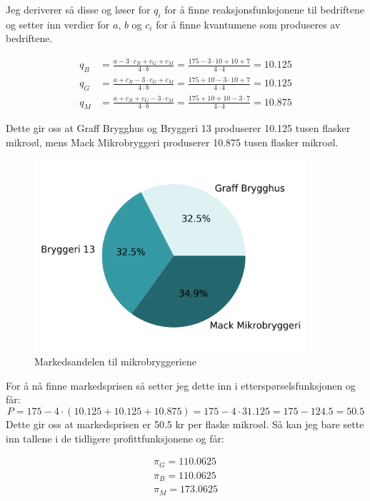 \documentclass[
  12pt,
  a4paper,
  DIV=11,
  numbers=noendperiod]{scrartcl}
\begin{document}
Jeg deriverer så disse og løser for \(q_i\) for å finne
reaksjonsfunksjonene til bedriftene og setter inn verdier for \(a\),
\(b\) og \(c_i\) for å finne kvantumene som produseres av bedriftene.

\begin{align*}
q_B &= \frac{a-3\cdot c_B + c_G + c_M}{4\cdot b}= \frac{175-3\cdot 10 + 10 + 7}{4\cdot 4} = 10.125 \\
q_G &= \frac{a + c_B - 3\cdot c_G + c_M}{4\cdot b} =  \frac{175 + 10 - 3\cdot 10 + 7}{4\cdot 4} = 10.125 \\
q_M &= \frac{a + c_B + c_G -3\cdot c_M}{4\cdot b} = \frac{175 + 10 + 10 -3\cdot 7}{4\cdot 4} = 10.875
\end{align*}

Dette gir oss at Graff Brygghus og Bryggeri 13 produserer 10.125 tusen
flasker mikroøl, mens Mack Mikrobryggeri produserer 10.875 tusen flasker
mikroøl.

\begin{figure}[h]
\centering
\includegraphics[width=0.9\textwidth]{dokumentobjekter/figurer/markedsandel_mikrobryggerier.png}
\caption{Markedsandelen til mikrobryggeriene}
\label{fig:markedsandel}
\end{figure}

For å nå finne markedsprisen så setter jeg dette inn i
etterspørselsfunksjonen og får: \[
P = 175 - 4\cdot(10.125 + 10.125 + 10.875) = 175 - 4\cdot 31.125 = 175 - 124.5 = 50.5
\] Dette gir oss at markedsprisen er 50.5 kr per flaske mikroøl. Så kan
jeg bare sette inn tallene i de tidligere profittfunksjonene og får:

\begin{align*}
\pi_G = 110.0625 \\
\pi_B = 110.0625 \\
\pi_M = 173.0625
\end{align*}
\end{document}
